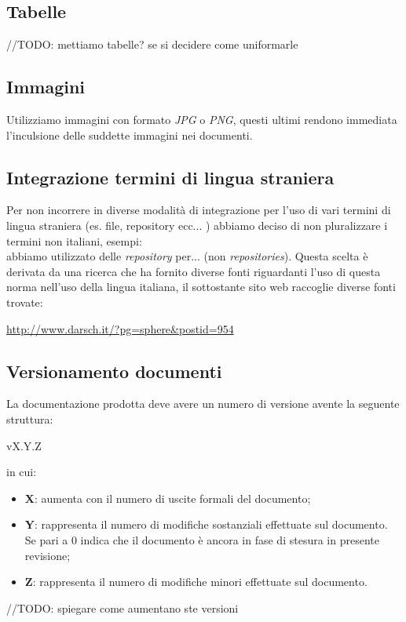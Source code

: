 \subsection{Tabelle}
//TODO: mettiamo tabelle? se si decidere come uniformarle

\subsection{Immagini}
Utilizziamo immagini con formato \textit{JPG} o \textit{PNG}, questi ultimi rendono immediata l'inculsione delle suddette immagini nei documenti.

\subsection{Integrazione termini di lingua straniera}
Per non incorrere in diverse modalità di integrazione per l'uso di vari termini di lingua straniera (es. file, repository ecc... ) abbiamo deciso di non pluralizzare i termini non italiani, esempi:\\
abbiamo utilizzato delle \textit{repository} per... (non \textit{repositories}).
Questa scelta è derivata da una ricerca che ha fornito diverse fonti riguardanti l'uso di questa norma nell'uso della lingua italiana, il sottostante sito web raccoglie diverse fonti trovate:\\
\begin{center}
\url{http://www.darsch.it/?pg=sphere&postid=954}
\end{center}

\subsection{Versionamento documenti}
La documentazione prodotta deve avere un numero di versione avente la seguente struttura:\\
\begin{center}
vX.Y.Z
\end{center}
in cui:
\begin{itemize}
\item \textbf{X}: aumenta con il numero di uscite formali del documento;
\item \textbf{Y}: rappresenta il numero di modifiche sostanziali effettuate sul documento. Se pari a 0 indica che il documento è ancora in fase di stesura in presente revisione;
\item \textbf{Z}: rappresenta il numero di modifiche minori effettuate sul documento.  
\end{itemize}
//TODO: spiegare come aumentano ste versioni

